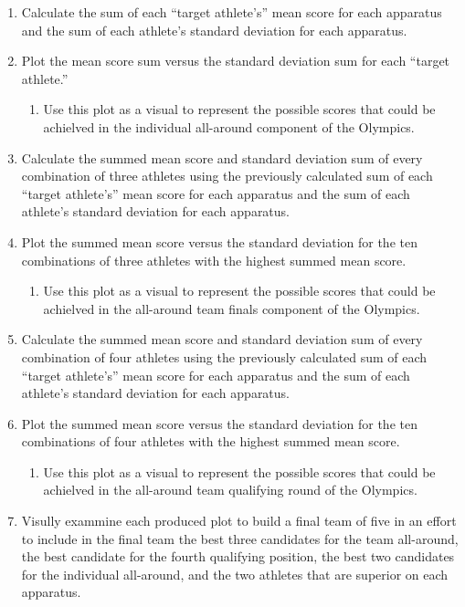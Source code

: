 \documentclass[12pt]{article}
\begin{document}
\begin{enumerate}
  \item Calculate the sum of each ``target athlete's'' mean score for each apparatus and the sum of each athlete's standard 
  deviation for each apparatus.
  \item Plot the mean score sum versus the standard deviation sum for each ``target athlete.''
  \begin{enumerate}
    \item Use this plot as a visual to represent the possible scores that could be achielved in the individual all-around 
    component of the Olympics.
  \end{enumerate}
  \item Calculate the summed mean score and standard deviation sum of every combination of three athletes using the previously 
  calculated sum of each ``target athlete's'' mean score for each apparatus and the sum of each athlete's standard 
  deviation for each apparatus.
  \item Plot the summed mean score versus the standard deviation for the ten combinations of three athletes with the 
  highest summed mean score.
  \begin{enumerate}
    \item Use this plot as a visual to represent the possible scores that could be achielved in the all-around team finals 
   component of the Olympics.
  \end{enumerate}
  \item Calculate the summed mean score and standard deviation sum of every combination of four athletes using the previously 
  calculated sum of each ``target athlete's'' mean score for each apparatus and the sum of each athlete's standard 
  deviation for each apparatus.
  \item Plot the summed mean score versus the standard deviation for the ten combinations of four athletes with the 
  highest summed mean score.
  \begin{enumerate}
    \item Use this plot as a visual to represent the possible scores that could be achielved in the all-around team qualifying  
   round of the Olympics.
  \end{enumerate}
  \item Visully exammine each produced plot to build a final team of five in an effort to include in 
  the final team the best three candidates for the team all-around, the best candidate for the fourth qualifying position, 
  the best two candidates for the individual all-around, and the two athletes that are superior on each apparatus.

\end{enumerate}
\end{document}
